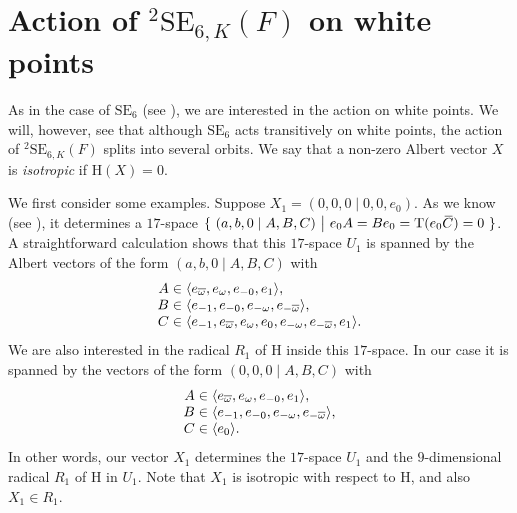 \documentclass{amsart}
\def\ovC{\mathord{\mbox{\hspace*{0pt}}\,\overline{\!C\!\!\;}\!\:}\mbox{\hspace*{0pt}}}
\newcommand{\SE}{\mathrm{SE}}
\newcommand{\Tr}{\operatorname{T}}
\renewcommand{\bar}{\overline}
\renewcommand{\H}{\mathrm{H}}
\theoremstyle{plain}
\numberwithin{theorem}{section}
\theoremstyle{definition}
\begin{document}
\section{Action of ${}^2\SE_{6,K}(F)$ on white points}

As in the case of $\SE_6$ (see \cite{BSW1}), we are interested in the action on white points. We will, however, see
that although $\SE_6$ acts transitively on white points, the action of ${}^2\SE_{6,K}(F)$ splits
into several orbits. We say that a non-zero Albert vector $X$ is \textit{isotropic} if
$\H(X) = 0$. 

We first consider some examples. Suppose $X_1 = (0,0,0\mid 0,0,e_0)$. As we know (see \cite[Section 7]{BSW1}),
it determines 
a $17$-space $\{\ (a,b,0 \mid A,B,C)\ \big|\ e_0 A = B e_0 = \Tr(e_0 \ovC) = 0\ \}$. A
straightforward calculation shows that
this $17$-space $U_1$ is spanned by the Albert vectors of the form \mbox{$(a,b,0\mid A,B,C)$} with
\begin{equation}
	\begin{array}{r@{\;}c@{\;}l}
		A & \in & \langle e_{\bar{\omega}}, e_{\omega}, e_{-0}, e_1 \rangle, \\
		B & \in & \langle e_{-1}, e_{-0}, e_{-\omega}, e_{-\bar{\omega}} \rangle, \\
		C & \in & \langle e_{-1}, e_{\bar{\omega}}, e_{\omega}, e_0, e_{-\omega}, e_{-\bar{\omega}}, e_1
		\rangle.
	\end{array}
\end{equation}
We are also interested in the radical $R_1$ of $\H$ inside this $17$-space. In our case it is spanned
by the vectors of the form \mbox{$(0,0,0\mid A,B,C)$} with
\begin{equation}
	\begin{array}{r@{\;}c@{\;}l}
		A & \in & \langle e_{\bar{\omega}}, e_{\omega}, e_{-0}, e_1 \rangle, \\
		B & \in & \langle e_{-1}, e_{-0}, e_{-\omega}, e_{-\bar{\omega}} \rangle, \\
		C & \in & \langle e_0 \rangle.
	\end{array}
\end{equation}
In other words, our vector $X_1$ determines the $17$-space $U_1$ and the $9$-dimensional radical $R_1$ 
of $\H$ in $U_1$. Note that $X_1$ is isotropic with respect to $\H$, and also $X_1 \in R_1$. 
\end{document}
